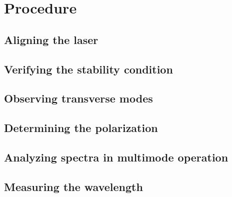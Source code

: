 \section{Procedure}

\subsection{Aligning the laser}

\subsection{Verifying the stability condition}

\subsection{Observing transverse modes}

\subsection{Determining the polarization}

\subsection{Analyzing spectra in multimode operation}

\subsection{Measuring the wavelength}
